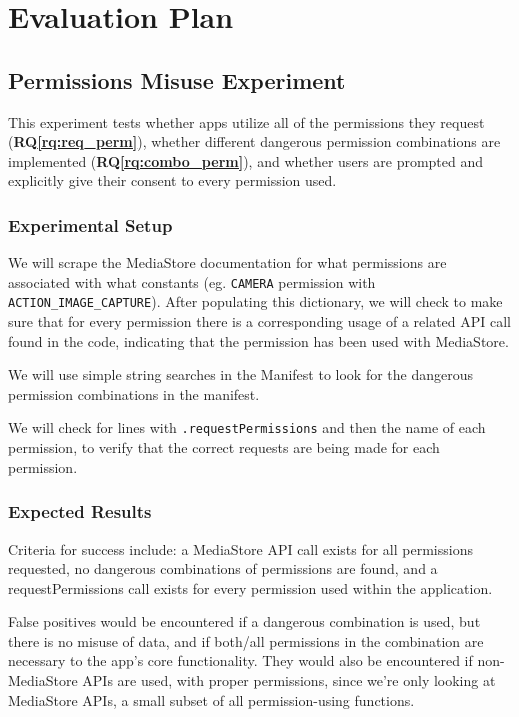 \documentclass[10pt,twocolumn,pdftex]{article}
\newcommand{\rqref}[1]{\textbf{RQ\ref{#1}}}
\begin{document}
\section{Evaluation Plan}


\subsection{Permissions Misuse Experiment}
This experiment tests whether apps utilize all of the permissions they request (\rqref{rq:req_perm}), whether different dangerous permission combinations are implemented (\rqref{rq:combo_perm}), and whether users are prompted and explicitly give their consent to every permission used.

    \subsubsection{Experimental Setup}
    We will scrape the MediaStore documentation for what permissions are associated with what constants (eg. \texttt{CAMERA} permission with \texttt{ACTION\_IMAGE\_CAPTURE}). After populating this dictionary, we will check to make sure that for every permission there is a corresponding usage of a related API call found in the code, indicating that the permission has been used with MediaStore.

    We will use simple string searches in the Manifest to look for the dangerous permission combinations in the manifest. 

    We will check for lines with \texttt{.requestPermissions} and then the name of each permission, to verify that the correct requests are being made for each permission.

    \subsubsection{Expected Results}
    Criteria for success include:
    a MediaStore API call exists for all permissions requested, 
    no dangerous combinations of permissions are found, and
    a requestPermissions call exists for every permission used within the application.

    False positives would be encountered if
    a dangerous combination is used, but there is no misuse of data, and if both/all permissions in the combination are necessary to the app’s core functionality.
    They would also be encountered if non-MediaStore APIs are used, with proper permissions, since we're only looking at MediaStore APIs, a small subset of all permission-using functions.
\end{document}
